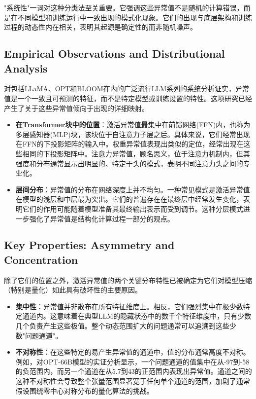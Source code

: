 \documentclass{article}
\begin{document}
"系统性"一词对这种分类法至关重要。它强调这些异常值不是随机的计算错误，而是在不同模型和训练运行中一致出现的模式化现象。它们的出现与底层架构和训练过程的动态性内在相关，表明其起源是确定性的而非随机噪声。

\subsection{Empirical Observations and Distributional Analysis}

对包括LLaMA、OPT和BLOOM在内的广泛流行LLM系列的系统分析证实，异常值是一个一致且可预测的特征，而不是特定模型或训练设置的特性。这项研究已经产生了关于这些异常值倾向于出现的详细映射。
  
  \begin{itemize}
  \item \textbf{在Transformer块中的位置}：激活异常值最集中在前馈网络(FFN)内，也称为多层感知器(MLP)块，该块位于自注意力子层之后。具体来说，它们经常出现在FFN的下投影矩阵的输入中。权重异常值表现出类似的定位，经常出现在这些相同的下投影矩阵中。注意力异常值，顾名思义，位于注意力机制内，但其强度和分布通常显示出明显的、特定于头的模式，表明不同注意力头之间的专业化。
  \item \textbf{层间分布}：异常值的分布在网络深度上并不均匀。一种常见模式是激活异常值在模型的浅层和中层最为突出。它们的普遍存在在最终层中经常发生变化，表明它们的作用可能随着模型准备其最终输出表示而受到调节。这种分层模式进一步强化了异常值是结构化计算过程一部分的观点。
  \end{itemize}

\subsection{Key Properties: Asymmetry and Concentration}

除了它们的位置之外，激活异常值的两个关键分布特性已被确定为它们对模型压缩（特别是量化）如此具有破坏性的主要原因。
  
  \begin{itemize}
  \item \textbf{集中性}：异常值并非散布在所有特征维度上。相反，它们强烈集中在极少数特定通道内。这意味着在典型LLM的隐藏状态中的数千个特征维度中，只有少数几个负责产生这些极值。整个动态范围扩大的问题通常可以追溯到这些少数"问题通道"。
  \item \textbf{不对称性}：在这些特定的易产生异常值的通道中，值的分布通常高度不对称。例如，对OPT-66B模型的实证分析显示，一个问题通道的值集中在从-97到-58的负范围内，而另一个通道在从5.7到43的正范围内表现出异常值。通道之间的这种不对称性会导致整个张量范围显著宽于任何单个通道的范围，加剧了通常假设围绕零中心对称分布的量化算法的挑战。
  \end{itemize}
\end{document}

